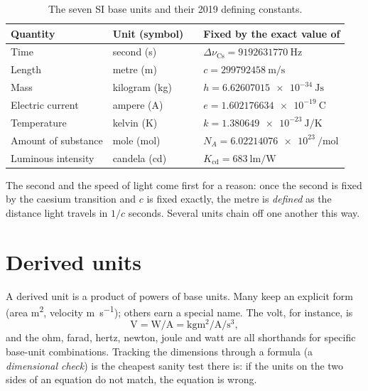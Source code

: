 \documentclass[11pt,a4paper,oneside]{book}
\begin{document}
\begin{table}[h]\centering\small
\caption{The seven SI base units and their 2019 defining constants.}
\label{tab:baseunits}
\begin{tabular}{@{}llcl@{}}
\toprule
Quantity & Unit (symbol) & & Fixed by the exact value of\\
\midrule
Time                & second (s)    & & $\Delta\nu_{\mathrm{Cs}}=\qty{9192631770}{\hertz}$\\
Length              & metre (m)     & & $c=\qty{299792458}{\meter\per\second}$\\
Mass                & kilogram (kg) & & $h=\qty{6.62607015e-34}{\joule\second}$\\
Electric current    & ampere (A)    & & $e=\qty{1.602176634e-19}{\coulomb}$\\
Temperature         & kelvin (K)    & & $k=\qty{1.380649e-23}{\joule\per\kelvin}$\\
Amount of substance & mole (mol)    & & $N_{\!A}=\qty{6.02214076e23}{\per\mole}$\\
Luminous intensity  & candela (cd)  & & $K_{\mathrm{cd}}=\qty{683}{\lumen\per\watt}$\\
\bottomrule
\end{tabular}
\end{table}

\begin{note}
The second and the speed of light come first for a reason: once the second is
fixed by the caesium transition and $c$ is fixed exactly, the metre is
\emph{defined} as the distance light travels in $1/c$ seconds. Several units
chain off one another this way.
\end{note}

\section{Derived units}

A derived unit is a product of powers of base units. Many keep an explicit form
(area \unit{\meter\squared}, velocity \unit{\meter\per\second}); others earn a
special name. The volt, for instance, is
\[
\unit{\volt}=\unit{\watt\per\ampere}
            =\unit{\kilogram\meter\squared\per\ampere\per\second\cubed},
\]
and the ohm, farad, hertz, newton, joule and watt are all shorthands for specific
base-unit combinations. Tracking the dimensions through a formula (a
\emph{dimensional check}) is the cheapest sanity test there is: if the units on
the two sides of an equation do not match, the equation is wrong.
\end{document}
